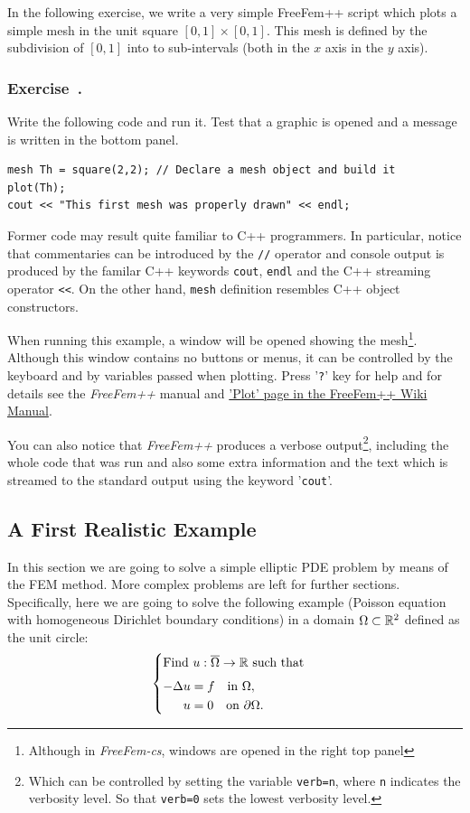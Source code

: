 \documentclass[12pt]{article}
\newcommand{\FF}{\textit{FreeFem++}\xspace}
\newcommand{\FFcs}{\textit{FreeFem-cs}\xspace}
\newcounter{exercise}
\newenvironment{exercise}{%
  \stepcounter{exercise}
  \subsubsection*{Exercise~\theexercise.}}
{}
\begin{document}
In the following exercise, we write a very simple FreeFem++ script
which plots a simple mesh in the unit square $[0,1]\times[0,1]$. This
mesh is defined by the subdivision of $[0,1]$ into to sub-intervals
(both in the $x$ axis in the $y$ axis).
\begin{exercise}
  Write the following code and run it. Test that a graphic
  is opened and a message is written in the bottom panel.
\begin{lstlisting}
mesh Th = square(2,2); // Declare a mesh object and build it
plot(Th);
cout << "This first mesh was properly drawn" << endl;
\end{lstlisting}
Former code may result quite familiar to C++ programmers. In
particular, notice that commentaries can be introduced by the
\texttt{//} operator and console output is produced by the familar C++
keywords \texttt{cout}, \texttt{endl} and the C++ streaming operator
\verb|<<|. On the other hand, \texttt{mesh} definition resembles C++
object constructors.

When running this example, a window will be opened showing the
mesh\footnote{Although in \FFcs, windows are opened in the right top
  panel}. Although this window contains no buttons or menus, it can be
controlled by the keyboard and by variables passed when
plotting. Press '\texttt{?}' key for help and for details see the \FF
manual and
\href{http://www.um.es/freefemv3/ff++/pmwiki.php?n=FFDoc.Plot}{'Plot'
  page in the FreeFem++ Wiki Manual}.

You can also notice that \FF produces a verbose
output\footnote{Which can be controlled by setting the variable
  \texttt{verb=n}, where \texttt{n} indicates the verbosity level. So
  that \texttt{verb=0} sets the lowest verbosity level.}, including
the whole code that was run and also some extra information and the
text which is streamed to the standard output using the keyword
'\texttt{cout}'.

\end{exercise}


\subsection{A First Realistic Example}

In this section we are going to solve a simple elliptic PDE problem by
means of the FEM method. More complex problems are left for further
sections.  Specifically, here we are going to solve the following
example (Poisson equation with homogeneous Dirichlet boundary
conditions) in a domain $\Omega\subset{\mathbb R}^2$ defined as the unit
circle:
\begin{equation*}
  \begin{cases}
    \text{Find } u:\overline\Omega \rightarrow \Rset
    \text{ such  that}
    \\\noalign{\medskip}
    \begin{aligned}
      -\Delta u &= f \quad\text{in } \Omega,
      \\
      u &= 0 \quad\text{on } \partial\Omega.
    \end{aligned}
  \end{cases}
\end{equation*}
\end{document}
